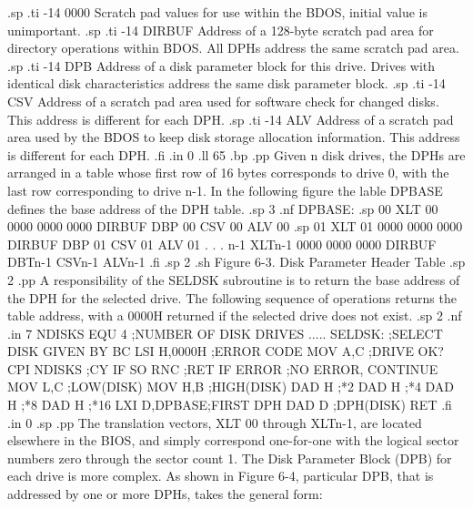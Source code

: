 .sp
.ti -14
0000          Scratch pad values for use within the BDOS, initial value is 
unimportant.
.sp
.ti -14
DIRBUF        Address of a 128-byte scratch pad area for directory operations 
within BDOS.  All DPHs address the same scratch pad area.
.sp
.ti -14
DPB           Address of a disk parameter block for this drive.  Drives with 
identical disk characteristics address the same disk parameter block.
.sp
.ti -14
CSV           Address of a scratch pad area used for software check for 
changed disks.  This address is different for each DPH.
.sp
.ti -14
ALV           Address of a scratch pad area used by the BDOS to keep disk 
storage allocation information.  This address is different for each DPH.
.fi
.in 0
.ll 65
.bp
.pp
Given n disk drives, the DPHs are arranged in a table whose first row of 16 
bytes corresponds to drive 0, with the last row corresponding to drive n-1.  
In the following figure the lable DPBASE defines the base address of the DPH 
table.
.sp 3
.nf
   DPBASE:
.sp
      00  XLT 00  0000  0000  0000  DIRBUF DBP 00 CSV 00 ALV 00
.sp
      01  XLT 01  0000  0000  0000  DIRBUF DBP 01 CSV 01 ALV 01
                                    . 
                                    .
                                    .
     n-1  XLTn-1  0000  0000  0000  DIRBUF DBTn-1 CSVn-1 ALVn-1 
.fi
.sp 2
.sh
            Figure 6-3.  Disk Parameter Header Table
.sp 2
.pp
A responsibility of the SELDSK subroutine is to return the base address of 
the DPH for the selected drive.  The following sequence of operations returns 
the table address, with a 0000H returned if the selected drive does not exist.
.sp 2
.nf
.in 7
 NDISKS      EQU     4         ;NUMBER OF DISK DRIVES
 .....
 SELDSK:     ;SELECT DISK GIVEN BY BC
             LSI     H,0000H   ;ERROR CODE
             MOV     A,C       ;DRIVE OK?
             CPI     NDISKS    ;CY IF SO
             RNC               ;RET IF ERROR
             ;NO ERROR, CONTINUE
             MOV     L,C       ;LOW(DISK)
             MOV     H,B       ;HIGH(DISK)
             DAD     H         ;*2
             DAD     H         ;*4
             DAD     H         ;*8
             DAD     H         ;*16
             LXI     D,DPBASE;FIRST DPH
             DAD     D         ;DPH(DISK)
             RET
.fi
.in 0
.sp 
.pp
The translation vectors, XLT 00 through XLTn-1, are located elsewhere in 
the BIOS, and simply correspond one-for-one with the logical sector numbers 
zero through the sector count 1.  The Disk Parameter Block (DPB) for each 
drive is more complex.  As shown in Figure 6-4, particular DPB, that is 
addressed by one or more DPHs, takes the general form:
